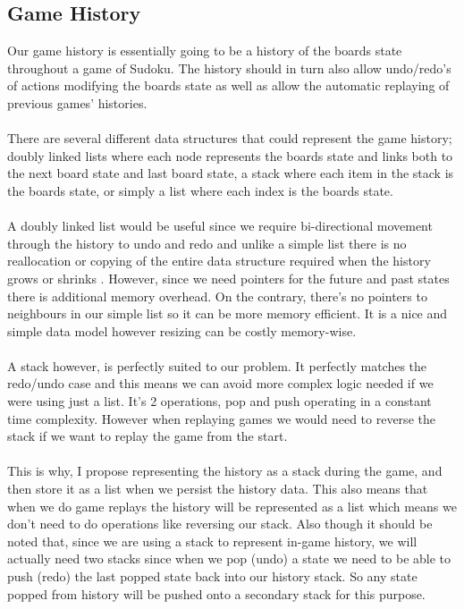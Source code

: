 \documentclass{article}
\begin{document}
\subsection{Game History}
Our game history is essentially going to be a history of the boards state throughout a game of Sudoku. The history should in turn also allow undo/redo's of actions modifying the boards state as well as allow the automatic replaying of previous games' histories. \\\\
There are several different data structures that could represent the game history; doubly linked lists where each node represents the boards state and links both to the next board state and last board state, a stack where each item in the stack is the boards state, or simply a list where each index is the boards state. \\\\
A doubly linked list would be useful since we require bi-directional movement through the history to undo and redo and unlike a simple list there is no reallocation or copying of the entire data structure required when the history grows or shrinks \parencite{cormen2009}. However, since we need pointers for the future and past states there is additional memory overhead. On the contrary, there's no pointers to neighbours in our simple list so it can be more memory efficient. It is a nice and simple data model however resizing can be costly memory-wise. \\\\
A stack however, is perfectly suited to our problem. It perfectly matches the redo/undo case and this means we can avoid more complex logic needed if we were using just a list. It's 2 operations, pop and push operating in a constant time complexity. However when replaying games we would need to reverse the stack if we want to replay the game from the start. \\\\
This is why, I propose representing the history as a stack during the game, and then store it as a list when we persist the history data. This also means that when we do game replays the history will be represented as a list which means we don't need to do operations like reversing our stack. Also though it should be noted that, since we are using a stack to represent in-game history, we will actually need two stacks since when we pop (undo) a state we need to be able to push (redo) the last popped state back into our history stack. So any state popped from history will be pushed onto a secondary stack for this purpose.
\end{document}
